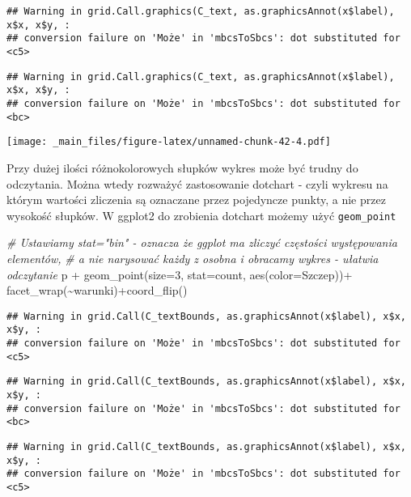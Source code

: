 \documentclass[
]{book}
\newenvironment{Shaded}{\begin{snugshade}}{\end{snugshade}}
\newcommand{\AttributeTok}[1]{\textcolor[rgb]{0.77,0.63,0.00}{#1}}
\newcommand{\CommentTok}[1]{\textcolor[rgb]{0.56,0.35,0.01}{\textit{#1}}}
\newcommand{\DecValTok}[1]{\textcolor[rgb]{0.00,0.00,0.81}{#1}}
\newcommand{\FunctionTok}[1]{\textcolor[rgb]{0.00,0.00,0.00}{#1}}
\newcommand{\NormalTok}[1]{#1}
\newcommand{\SpecialCharTok}[1]{\textcolor[rgb]{0.00,0.00,0.00}{#1}}
\newcommand{\StringTok}[1]{\textcolor[rgb]{0.31,0.60,0.02}{#1}}
\begin{document}
\begin{verbatim}
## Warning in grid.Call.graphics(C_text, as.graphicsAnnot(x$label), x$x, x$y, :
## conversion failure on 'Może' in 'mbcsToSbcs': dot substituted for <c5>
\end{verbatim}

\begin{verbatim}
## Warning in grid.Call.graphics(C_text, as.graphicsAnnot(x$label), x$x, x$y, :
## conversion failure on 'Może' in 'mbcsToSbcs': dot substituted for <bc>
\end{verbatim}

\texttt{[image: \_main\_files/figure-latex/unnamed-chunk-42-4.pdf]}

Przy dużej ilości różnokolorowych słupków wykres może być trudny do odczytania. Można wtedy rozważyć zastosowanie dotchart - czyli wykresu na którym wartości zliczenia są oznaczane przez pojedyncze punkty, a nie przez wysokość słupków. W ggplot2 do zrobienia dotchart możemy użyć \texttt{geom\_point}

\begin{Shaded}
\begin{Highlighting}[]
\CommentTok{\# Ustawiamy stat="bin" {-} oznacza że ggplot ma zliczyć częstości występowania elementów,}
\CommentTok{\# a nie narysować każdy z osobna i obracamy wykres {-} ułatwia odczytanie}
\NormalTok{p }\SpecialCharTok{+} \FunctionTok{geom\_point}\NormalTok{(}\AttributeTok{size=}\DecValTok{3}\NormalTok{, }\AttributeTok{stat=}\StringTok{\textquotesingle{}count\textquotesingle{}}\NormalTok{, }\FunctionTok{aes}\NormalTok{(}\AttributeTok{color=}\NormalTok{Szczep))}\SpecialCharTok{+}
  \FunctionTok{facet\_wrap}\NormalTok{(}\SpecialCharTok{\textasciitilde{}}\NormalTok{warunki)}\SpecialCharTok{+}\FunctionTok{coord\_flip}\NormalTok{()}
\end{Highlighting}
\end{Shaded}

\begin{verbatim}
## Warning in grid.Call(C_textBounds, as.graphicsAnnot(x$label), x$x, x$y, :
## conversion failure on 'Może' in 'mbcsToSbcs': dot substituted for <c5>
\end{verbatim}

\begin{verbatim}
## Warning in grid.Call(C_textBounds, as.graphicsAnnot(x$label), x$x, x$y, :
## conversion failure on 'Może' in 'mbcsToSbcs': dot substituted for <bc>
\end{verbatim}

\begin{verbatim}
## Warning in grid.Call(C_textBounds, as.graphicsAnnot(x$label), x$x, x$y, :
## conversion failure on 'Może' in 'mbcsToSbcs': dot substituted for <c5>
\end{verbatim}
\end{document}
